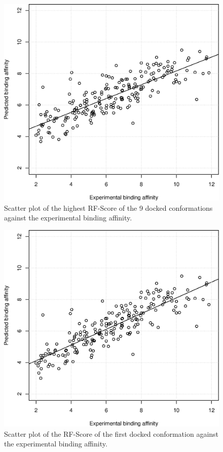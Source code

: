 \begin{figure}
\begin{center}
\includegraphics[width=\linewidth]{../istar/pK-idockConfsRFScoreMax.eps}
\end{center}
\caption{Scatter plot of the highest RF-Score of the 9 docked conformations against the experimental binding affinity.}
\label{istar:pK-idockConfsRFScoreMax}
\end{figure}

\begin{figure}
\begin{center}
\includegraphics[width=\linewidth]{../istar/pK-idockConf1RFScore.eps}
\end{center}
\caption{Scatter plot of the RF-Score of the first docked conformation against the experimental binding affinity.}
\label{istar:pK-idockConf1RFScore}
\end{figure}

